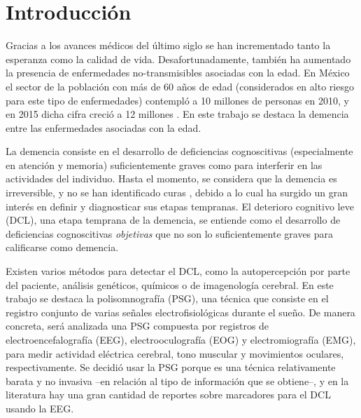 \documentclass[12pt,letterpaper]{book}
\renewcommand{\headrulewidth}{0pt}
\begin{document}

\pagestyle{fancy}
    \fancyhead[LO]{\sectionmark}
    \fancyhead[RE]{\chaptermark}
    \fancyfoot[CE,CO]{}
    \fancyfoot[LE,RO]{\thepage}
    \renewcommand{\headrulewidth}{1.5pt}


\chapter*{Introducción}

Gracias a los avances médicos del último siglo se han incrementado tanto la esperanza como la calidad de vida. 
%
Desafortunadamente, también ha aumentado la presencia de enfermedades no-transmisibles asociadas con la edad. 
%
En México el sector de la población con más de 60 años de edad (considerados en alto riesgo para este tipo de enfermedades) contempló a 10 millones de personas en 2010, y en 2015 dicha cifra creció a 12 millones \cite{Censo10,Intercensal15}.
%
En este trabajo se destaca la demencia entre las enfermedades asociadas con la edad.

La demencia consiste en el desarrollo de deficiencias cognoscitivas (especialmente en atención y memoria) suficientemente graves como para interferir en las actividades del individuo.
%
Hasta el momento, se considera que la demencia es irreversible, y no se han identificado curas \cite{PlanAlzheimer04}, debido a lo cual ha surgido un gran interés en definir y diagnosticar sus etapas tempranas.
%
El deterioro cognitivo leve (DCL), una etapa temprana de la demencia, se entiende como el desarrollo de deficiencias cognoscitivas \textit{objetivas} que no son lo suficientemente graves para calificarse como demencia.

Existen varios métodos para detectar el DCL, como la autopercepción por parte del paciente, análisis genéticos, químicos o de imagenología cerebral.
%
En este trabajo se destaca la polisomnografía (PSG), una técnica que consiste en el registro conjunto de varias señales electrofisiológicas durante el sueño.
%
De manera concreta, será analizada una PSG compuesta por registros de electroencefalografía (EEG), electrooculografía (EOG) y electromiografía (EMG), para medir actividad eléctrica cerebral, tono muscular y movimientos oculares, respectivamente.
%
Se decidió usar la PSG porque es una técnica relativamente barata y no invasiva --en relación al tipo de información que se obtiene--, y en la literatura hay una gran cantidad de reportes sobre marcadores para el DCL usando la EEG.
\end{document}
